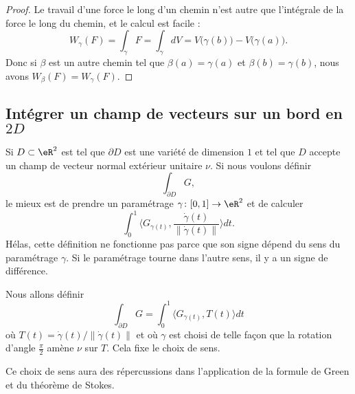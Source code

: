 \begin{proof}
	Le travail d'une force le long d'un chemin n'est autre que l'intégrale de la force le long du chemin, et le calcul est facile :
	\begin{equation}
		W_{\gamma}(F)=\int_{\gamma}F=\int_{\gamma}dV=V\big( \gamma(b) \big)-V\big( \gamma(a) \big).
	\end{equation}
	Donc si \( \beta\) est un autre chemin tel que \( \beta(a)=\gamma(a)\) et \( \beta(b)=\gamma(b)\), nous avons \( W_{\beta}(F)=W_{\gamma}(F)\).
\end{proof}

\subsection{Intégrer un champ de vecteurs sur un bord en \texorpdfstring{\(  2D\)}{2D}}

Si \( D\subset\eR^2\) est tel que \( \partial D\) est une variété de dimension \( 1\) et tel que \( D\) accepte un champ de vecteur normal extérieur unitaire \( \nu\). Si nous voulons définir
\begin{equation}
	\int_{\partial D}G,
\end{equation}
le mieux est de prendre un paramétrage \( \gamma\colon \mathopen[ 0 , 1 \mathclose]\to \eR^2\) et de calculer
\begin{equation}
	\int_0^1 \langle G_{\gamma(t)}, \frac{ \dot\gamma(t) }{ \| \dot\gamma(t) \| }\rangle dt.
\end{equation}
Hélas, cette définition ne fonctionne pas parce que son signe dépend du sens du paramétrage \( \gamma\). Si le paramétrage tourne dans l'autre sens, il y a un signe de différence.

Nous allons définir
\begin{equation}		\label{EqIntVectbordDeux}
	\int_{\partial D}G=\int_0^1\langle G_{\gamma(t)}, T(t)\rangle dt
\end{equation}
où \( T(t)=\dot\gamma(t)/\| \dot\gamma(t) \|\) et où \( \gamma\) est choisi de telle façon que la rotation d'angle \( \frac{ \pi }{ 2 }\) amène \( \nu\) sur \( T\). Cela fixe le choix de sens.

Ce choix de sens aura des répercussions dans l'application de la formule de Green et du théorème de Stokes.

